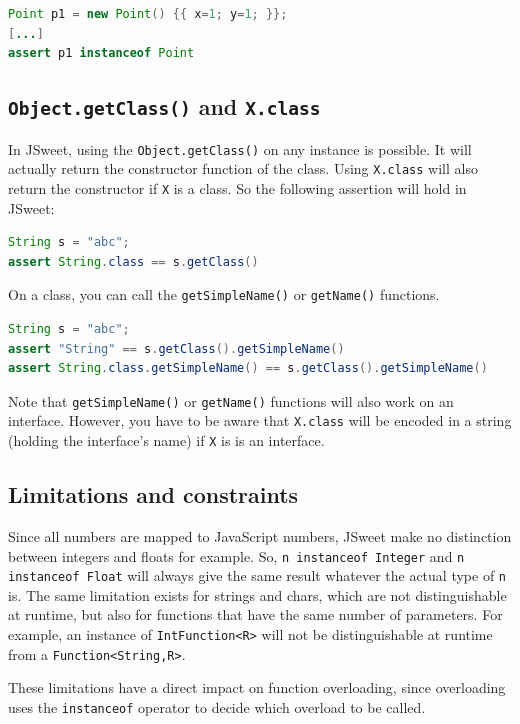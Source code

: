 \documentclass[a4paper]{report}
\begin{document}
\begin{lstlisting}[language=Java]
Point p1 = new Point() {{ x=1; y=1; }};
[...]
assert p1 instanceof Point
\end{lstlisting}

\subsection{\texttt{Object.getClass()} and \texttt{X.class}}

In JSweet, using the \texttt{Object.getClass()} on any instance is possible. It will actually return the constructor function of the class. Using \texttt{X.class} will also return the constructor if \texttt{X} is a class. So the following assertion will hold in JSweet:
 
\begin{lstlisting}[language=Java]
String s = "abc";
assert String.class == s.getClass()
\end{lstlisting}

On a class, you can call the \texttt{getSimpleName()} or \texttt{getName()} functions. 

\begin{lstlisting}[language=Java]
String s = "abc";
assert "String" == s.getClass().getSimpleName()
assert String.class.getSimpleName() == s.getClass().getSimpleName()
\end{lstlisting}

Note that \texttt{getSimpleName()} or \texttt{getName()} functions will also work on an interface. However, you have to be aware that \texttt{X.class} will be encoded in a string (holding the interface's name) if \texttt{X} is is an interface. 

\subsection{Limitations and constraints}

Since all numbers are mapped to JavaScript numbers, JSweet make no distinction between integers and floats for example. So, \texttt{n instanceof Integer} and \texttt{n instanceof Float} will always give the same result whatever the actual type of \texttt{n} is. The same limitation exists for strings and chars, which are not distinguishable at runtime, but also for functions that have the same number of parameters. For example, an instance of \texttt{IntFunction<R>} will not be distinguishable at runtime from a \texttt{Function<String,R>}. 

These limitations have a direct impact on function overloading, since overloading uses the \texttt{instanceof} operator to decide which overload to be called.
\end{document}
